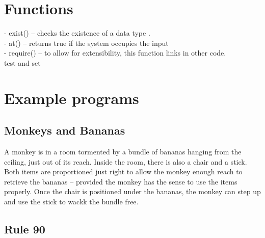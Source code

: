 \documentclass[
a4paper, %
11pt, %
onecolumn, %
openany, %
]{memoir}
\begin{document}
\section*{Functions}
- exist() -- checks the existence of a data type \cite{appl_nasa}.\\
- at() -- returns true if the system occupies the input\\
- require() -- to allow for extensibility, this function links in other code.\\
test and set \\

\section*{Example programs}
\subsection*{Monkeys and Bananas}
A monkey is in a room tormented by a bundle of bananas hanging from the ceiling, just out of its reach. Inside the room, there is also a chair and a stick. Both items are proportioned just right to allow the monkey enough reach to retrieve the bananas -- provided the monkey has the sense to use the items properly. Once the chair is positioned under the bananas, the monkey can step up and use the stick to wackk the bundle free. 
%
\subsection*{Rule 90}

\backmatter





\end{document}
